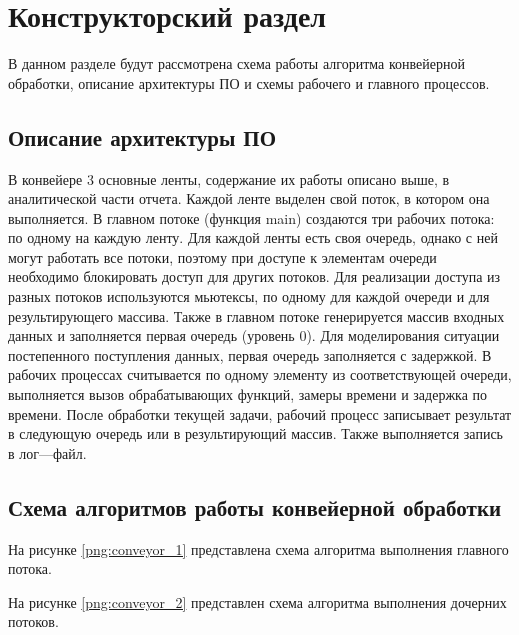 \chapter{Конструкторский раздел}
В данном разделе будут рассмотрена схема работы алгоритма конвейерной обработки, описание архитектуры ПО и схемы рабочего и главного процессов.

\section{Описание архитектуры ПО}
В конвейере 3 основные ленты, содержание их работы описано выше, в аналитической части отчета. Каждой ленте выделен свой поток, в котором она выполняется. В главном потоке (функция main) создаются три рабочих потока: по одному на каждую ленту.
Для каждой ленты есть своя очередь, однако с ней могут работать все потоки, поэтому при доступе к элементам очереди необходимо блокировать доступ для других потоков. Для реализации доступа из разных потоков используются мьютексы, по одному для каждой очереди и для результирующего массива.
Также в главном потоке генерируется массив входных данных и заполняется первая очередь (уровень 0). Для моделирования ситуации постепенного поступления данных, первая очередь заполняется с задержкой.
В рабочих процессах считывается по одному элементу из соответствующей очереди, выполняется вызов обрабатывающих функций, замеры времени и задержка по времени. После обработки текущей задачи, рабочий процесс записывает результат в следующую очередь или в результирующий массив. Также выполняется запись в лог—файл.
\section{Схема алгоритмов работы конвейерной обработки}
На рисунке \ref{png:conveyor_1} представлена схема алгоритма выполнения главного потока.
\begin{figure}[H]
\end{figure}
На рисунке \ref{png:conveyor_2} представлен схема алгоритма выполнения дочерних потоков.
\newpage
\begin{figure}[H]
\end{figure}
